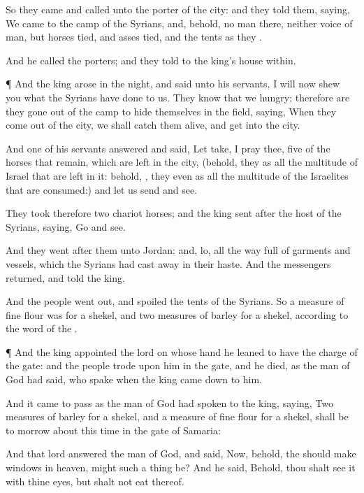 {So they
came and
called unto the
porter of the
city: and they
told them,
saying, We
came to the
camp of the
Syrians, and, behold,
{} no
man there, neither
voice of
man, but
horses
tied, and
asses
tied, and the
tents as they
{}.

And he
called the
porters; and they
told
{} to the
king’s
house
within.


\par }{\PP {}¶ And the
king
arose in the
night, and
said unto his
servants, I will now
shew you what the
Syrians have
done to us. They
know that we
{}
hungry; therefore are they gone
out of the
camp to
hide themselves in the
field,
saying, When they come
out of the
city, we shall
catch them
alive, and
get into the
city.

And
one of his
servants
answered and
said, Let
{}
take, I pray thee,
five of the
horses that
remain, which are
left in the city, (behold, they
{} as all the
multitude of
Israel that are
left in it: behold,
{}, they
{} even as all the
multitude of the
Israelites that are
consumed:) and let us
send and
see.

They
took therefore
two
chariot
horses; and the
king
sent
after the
host of the
Syrians,
saying,
Go and
see.

And they
went
after them unto
Jordan: and, lo, all the
way
{}
full of
garments and
vessels, which the
Syrians had cast
away in their
haste. And the
messengers
returned, and
told the
king.

And the
people went
out, and
spoiled the
tents of the
Syrians. So a
measure of fine
flour was
{} for a
shekel, and two
measures of
barley for a
shekel, according to the
word of the
{}.


\par }{\PP {}¶ And the
king
appointed the
lord on whose
hand he
leaned to have the charge of the
gate: and the
people
trode upon him in the
gate, and he
died, as the
man of
God had
said, who
spake when the
king came
down to him.

And it came to pass as the
man of
God had
spoken to the
king,
saying, Two
measures of
barley for a
shekel, and a
measure of fine
flour for a
shekel, shall be to
morrow about this
time in the
gate of
Samaria:

And that
lord
answered the
man of
God, and
said, Now, behold,
{} the
{} should
make
windows in
heaven, might such a
thing be? And he
said, Behold, thou shalt
see it with thine
eyes, but shalt not
eat thereof.

}
